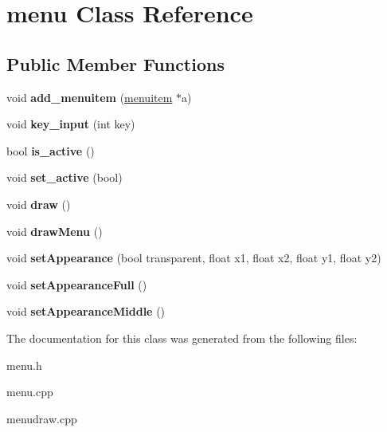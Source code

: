 \hypertarget{classmenu}{\section{menu Class Reference}
\label{classmenu}
}
\subsection*{Public Member Functions}
\begin{DoxyCompactItemize}
\item 
\hypertarget{classmenu_a249a216b0c4fc43c605f5ee1cc6efdf0}{void {\bfseries add\-\_\-menuitem} (\hyperlink{classmenuitem}{menuitem} $\ast$a)}\label{classmenu_a249a216b0c4fc43c605f5ee1cc6efdf0}

\item 
\hypertarget{classmenu_ad127a885a2e996ba10d626d6feab7039}{void {\bfseries key\-\_\-input} (int key)}\label{classmenu_ad127a885a2e996ba10d626d6feab7039}

\item 
\hypertarget{classmenu_a66972e75031e55aca63a973e67f5a82b}{bool {\bfseries is\-\_\-active} ()}\label{classmenu_a66972e75031e55aca63a973e67f5a82b}

\item 
\hypertarget{classmenu_af1697c138773f4d23f73f042f49aade5}{void {\bfseries set\-\_\-active} (bool)}\label{classmenu_af1697c138773f4d23f73f042f49aade5}

\item 
\hypertarget{classmenu_a6fcf97a34d06d1889ae8cf52e5060d06}{void {\bfseries draw} ()}\label{classmenu_a6fcf97a34d06d1889ae8cf52e5060d06}

\item 
\hypertarget{classmenu_ae817e5dae0bb7b87f979aff7e3b07cb9}{void {\bfseries draw\-Menu} ()}\label{classmenu_ae817e5dae0bb7b87f979aff7e3b07cb9}

\item 
\hypertarget{classmenu_a80c0c04f4a6569cdc7f6161139570eb2}{void {\bfseries set\-Appearance} (bool transparent, float x1, float x2, float y1, float y2)}\label{classmenu_a80c0c04f4a6569cdc7f6161139570eb2}

\item 
\hypertarget{classmenu_ad4331a050513af4f341120c1533856f2}{void {\bfseries set\-Appearance\-Full} ()}\label{classmenu_ad4331a050513af4f341120c1533856f2}

\item 
\hypertarget{classmenu_a4e1f99eb6b363998f6f54cf444729422}{void {\bfseries set\-Appearance\-Middle} ()}\label{classmenu_a4e1f99eb6b363998f6f54cf444729422}

\end{DoxyCompactItemize}


The documentation for this class was generated from the following files\-:\begin{DoxyCompactItemize}
\item 
menu.\-h\item 
menu.\-cpp\item 
menudraw.\-cpp\end{DoxyCompactItemize}
